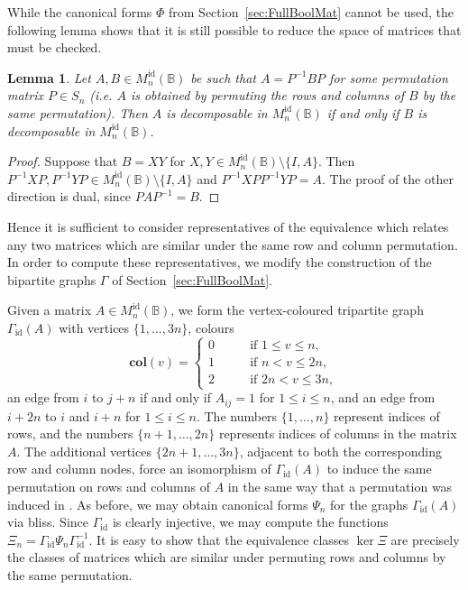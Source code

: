 \documentclass[11pt]{article}
\newtheorem{lemma}[thm]{Lemma}
\numberwithin{equation}{section}
\newcommand{\B}{\mathbb{B}}
\newcommand{\Refln}{M_n^{\text{id}}(\B)}
\begin{document}
While the canonical forms $\Phi$ from Section~\ref{sec:FullBoolMat} cannot be
used, the following lemma shows that it is still possible to reduce the space of
matrices that must be checked.

\begin{lemma}
  Let $A, B \in \Refln$ be such that $A = P^{-1} B P$ for some permutation matrix
  $P \in S_n$ (i.e. $A$ is obtained by permuting the rows and columns of $B$ by
  the same permutation). Then $A$ is decomposable in $\Refln$ if and only if $B$
  is decomposable in $\Refln$.
\end{lemma}
\begin{proof}
  Suppose that $B = XY$ for $X, Y \in \Refln\setminus \{I, A\}$. Then $P^{-1}XP,
  P^{-1}YP \in \Refln\setminus\{I, A\}$ and $P^{-1}XPP^{-1}YP = A$. The proof of
  the other direction is dual, since $PAP^{-1} = B$.
\end{proof}

Hence it is sufficient to consider representatives of the equivalence
which relates any two matrices which are similar under the same row and column
permutation. In order to compute these representatives, we modify the
construction of the bipartite graphs $\Gamma$ of Section~\ref{sec:FullBoolMat}.

Given a matrix $A \in \Refln$, we form the vertex-coloured tripartite graph
$\Gamma_\text{id}(A)$ with vertices $\{1, \ldots, 3n\}$, colours 
\[\mathbf{col}(v) = \begin{cases}
    0 \qquad &\text{if } 1 \leq v \leq n, \\
    1 \qquad &\text{if } n < v \leq 2n, \\
    2 \qquad &\text{if } 2n < v \leq 3n,
  \end{cases}
\]
an edge from $i$ to $j+n$ if and only if $A_{ij} = 1$ for $1 \leq i \leq n$,
and an edge from $i + 2n$ to $i$ and $i + n$ for $1 \leq i \leq n$. The numbers $\{1,
  \ldots, n\}$ represent indices of rows, and the numbers $\{n + 1, \ldots, 2n\}$
represents indices of columns in the matrix $A$. The additional vertices $\{2n +
  1, \ldots, 3n\}$, adjacent to both the corresponding row and column nodes,
force an isomorphism of $\Gamma_\text{id}(A)$ to induce the same permutation on rows and
columns of $A$ in the same way that a permutation was induced in
. As before, we may obtain canonical forms
$\Psi_n$ for the graphs $\Gamma_{\text{id}}(A)$ via bliss. Since
$\Gamma_\text{id}$ is clearly injective, we may compute the functions
$\Xi_n = \Gamma_\text{id}\Psi_n\Gamma_\text{id}^{-1}$. It is easy to show that
the equivalence classes $\ker\Xi$ are precisely the classes of matrices which
are similar under permuting rows and columns by the same permutation.
\end{document}
